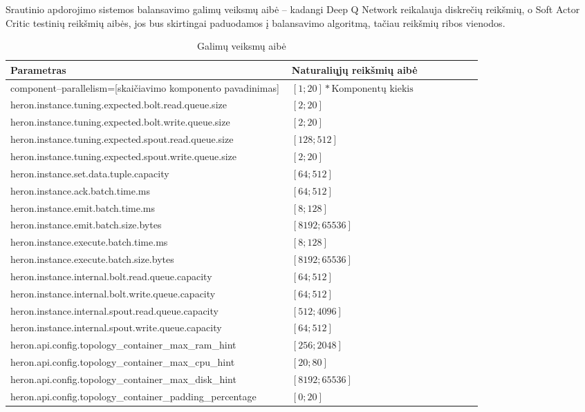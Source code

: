 \documentclass{VUMIFPSbakalaurinis}
\begin{document}
Srautinio apdorojimo sistemos balansavimo galimų veiksmų aibė – kadangi Deep Q Network reikalauja diskrečių reikšmių, o Soft Actor Critic testinių reikšmių aibės, jos bus skirtingai paduodamos į balansavimo algoritmą, tačiau reikšmių ribos vienodos.
\begin{longtable}{|p{0.59\linewidth}|p{0.4\linewidth}|}
    \caption{Galimų veiksmų aibė}
    \label{param–table}\\
    \hline
    \rowcolor[HTML]{C0C0C0} 
    Parametras     & Naturaliųjų reikšmių aibė       \\ \hline
    \endfirsthead
    \endhead
    component–parallelism=[skaičiavimo komponento pavadinimas]& \([1;20] * \text{Komponentų kiekis}\)\\ \hline
    heron.instance.tuning.expected.bolt.read.queue.size       & \([2;20]\) \\ \hline
    heron.instance.tuning.expected.bolt.write.queue.size      & \([2;20]\) \\ \hline
    heron.instance.tuning.expected.spout.read.queue.size      & \([128;512]\) \\ \hline
    heron.instance.tuning.expected.spout.write.queue.size     & \([2;20]\) \\ \hline
    heron.instance.set.data.tuple.capacity                    & \([64;512]\) \\ \hline
    heron.instance.ack.batch.time.ms                          & \([64;512]\) \\ \hline
    heron.instance.emit.batch.time.ms                         & \([8;128]\) \\ \hline
    heron.instance.emit.batch.size.bytes                      & \([8192;65536]\) \\ \hline
    heron.instance.execute.batch.time.ms                      & \([8;128]\) \\ \hline
    heron.instance.execute.batch.size.bytes                   & \([8192;65536]\) \\ \hline
    heron.instance.internal.bolt.read.queue.capacity          & \([64;512]\) \\ \hline
    heron.instance.internal.bolt.write.queue.capacity         & \([64;512]\) \\ \hline
    heron.instance.internal.spout.read.queue.capacity         & \([512;4096]\) \\ \hline
    heron.instance.internal.spout.write.queue.capacity        & \([64;512]\) \\ \hline
    heron.api.config.topology\_container\_max\_ram\_hint      & \([256;2048]\) \\ \hline
    heron.api.config.topology\_container\_max\_cpu\_hint      & \([20;80]\) \\ \hline
    heron.api.config.topology\_container\_max\_disk\_hint     & \([8192;65536]\) \\ \hline
    heron.api.config.topology\_container\_padding\_percentage & \([0;20]\) \\ \hline
\end{longtable}
\end{document}
